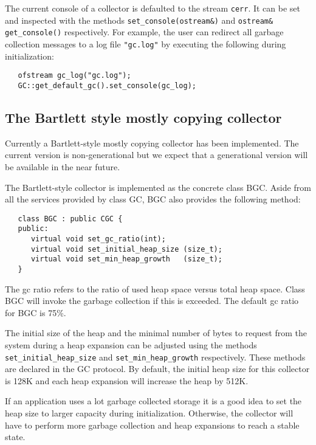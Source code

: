    The current console of a collector is defaulted to the \CPP{} stream
\verb|cerr|.  It can be set and inspected with the methods
\verb|set_console(ostream&)| and \verb|ostream& get_console()| respectively.
For example, the user can redirect all garbage collection messages
to a log file \verb|"gc.log"| by executing the following during initialization:

\begin{verbatim}
   ofstream gc_log("gc.log");
   GC::get_default_gc().set_console(gc_log); 
\end{verbatim}

\subsection{The Bartlett style mostly copying collector}

   Currently a Bartlett-style mostly copying collector has been implemented.
The current version is non-generational but we expect that a generational
version will be available in the near future.

   The Bartlett-style collector is implemented as the concrete class
{\sf BGC}.  Aside from all the services provided by class {\sf GC},
{\sf BGC} also provides the following method:

\begin{verbatim}
   class BGC : public CGC {
   public:
      virtual void set_gc_ratio(int);
      virtual void set_initial_heap_size (size_t);
      virtual void set_min_heap_growth   (size_t);
   }
\end{verbatim}

  The gc ratio refers to the ratio of used heap space versus
total heap space.  Class {\sf BGC} will invoke the garbage collection
if this is exceeded.  The default gc ratio for {\sf BGC} is 75\%.

  The initial size of the heap and the minimal number of bytes to 
request from the system during a heap expansion can be adjusted using 
the methods \verb|set_initial_heap_size| and \verb|set_min_heap_growth|
respectively.  These methods are declared in the {\sf GC}
protocol.   By default, the initial heap size for this collector
is 128K and each heap expansion will increase the heap by 512K. 

If an application uses a lot garbage collected storage it is a good
idea to set the heap size to larger capacity during initialization.
Otherwise, the collector will have to perform more garbage collection
and heap expansions to reach a stable state. 

